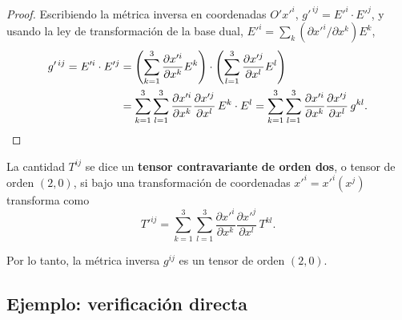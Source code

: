 \begin{proof}
Escribiendo la métrica inversa en coordenadas $O'x'^i$, $g'^{\,ij} = E'^i\cdot E'^j$, y usando la ley de transformación de la base dual, $E'^i = \sum_k(\partial x'^i/\partial x^k)E^k$,
\begin{align}
g'^{\,ij} = E'^i\cdot E'^j
&= \left(\sum_{k=1}^3\frac{\partial x'^i}{\partial x^k}E^k\right)\cdot\left(\sum_{l=1}^3\frac{\partial x'^j}{\partial x^l}E^l\right) \notag \\
&= \sum_{k=1}^3\sum_{l=1}^3 \frac{\partial x'^i}{\partial x^k}\frac{\partial x'^j}{\partial x^l}\, E^k\cdot E^l
= \sum_{k=1}^3\sum_{l=1}^3 \frac{\partial x'^i}{\partial x^k}\frac{\partial x'^j}{\partial x^l}\, g^{kl} .
\end{align}
\end{proof}

\begin{definicion}
La cantidad $T^{ij}$ se dice un \textbf{tensor contravariante de orden dos}, o tensor de orden $(2,0)$, si bajo una transformación de coordenadas $x'^i=x'^i(x^j)$ transforma como
\begin{equation}
T'^{ij} = \sum_{k=1}^3\sum_{l=1}^3 \frac{\partial x'^i}{\partial x^k}\frac{\partial x'^j}{\partial x^l}\, T^{kl} .
\end{equation}
\end{definicion}
Por lo tanto, la métrica inversa $g^{ij}$ es un tensor de orden $(2,0)$.

\subsection{Ejemplo: verificación directa}

